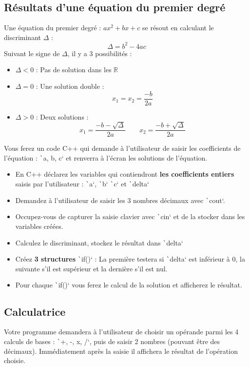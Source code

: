 \documentclass[10pt]{article}
\begin{document}
\subsection{Résultats d'une équation du premier degré}
Une équation du premier degré : $ax^2+bx+c$ se résout en calculant le discriminant $\Delta$ : 
$$\Delta=b^2-4ac$$
Suivant le signe de $\Delta$, il y a 3 possibilités :
\begin{itemize}
    \item $\Delta<0$ : Pas de solution dans les $\mathbb{R}$
    \item $\Delta=0$ : Une solution double : $$x_1=x_2=\frac{-b}{2a}$$
    \item $\Delta>0$ : Deux solutions : $$x_1=\frac{-b-\sqrt{\Delta}}{2a} \qquad x_2=\frac{-b+\sqrt{\Delta}}{2a}$$
\end{itemize}

Vous ferez un code C++ qui demande à l'utilisateur de saisir les coefficients de l'équation : \texttt`a, b, c` et renverra à l'écran les solutions de l'équation.

\begin{itemize}
    \item En C++ déclarez les variables qui contiendront \textbf{les coefficients entiers} saisis par l'utilisateur : \texttt`a`, \texttt`b` \texttt`c` et \texttt`delta` 
    \item Demandez à l'utilisateur de saisir les 3 nombres décimaux avec \texttt`cout`. 
    \item Occupez-vous de capturer la saisie clavier avec \texttt`cin` et de la stocker dans les variables créées.
    \item Calculez le discriminant, stockez le résultat dans \texttt`delta`
    \item Créez \textbf{3 structures} \texttt`if()` : La première testera si \texttt`delta` est inférieur à 0, la suivante s'il est supérieur et la dernière s'il est nul.
    \item Pour chaque \texttt`if()` vous ferez le calcul de la solution et afficherez le résultat.
\end{itemize}


\subsection{Calculatrice}
Votre programme demandera à l'utilisateur de choisir un opérande parmi les 4 calculs de bases : \texttt`+, -, x, /`, 
puis de saisir 2 nombres (pouvant être des décimaux). Immédiatement après la saisie il affichera le résultat de l'opération
choisie.
\end{document}
